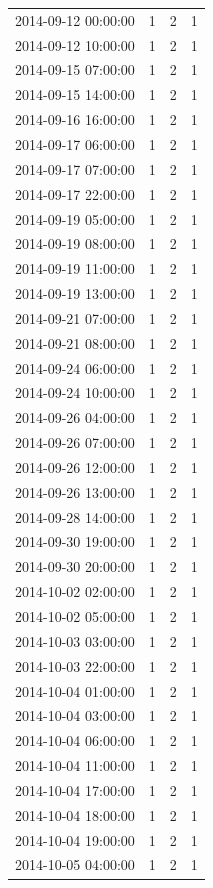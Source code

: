 \begin{tabular}{lrrr}
2014-09-12 00:00:00 & 1 & 2 & 1 \\
2014-09-12 10:00:00 & 1 & 2 & 1 \\
2014-09-15 07:00:00 & 1 & 2 & 1 \\
2014-09-15 14:00:00 & 1 & 2 & 1 \\
2014-09-16 16:00:00 & 1 & 2 & 1 \\
2014-09-17 06:00:00 & 1 & 2 & 1 \\
2014-09-17 07:00:00 & 1 & 2 & 1 \\
2014-09-17 22:00:00 & 1 & 2 & 1 \\
2014-09-19 05:00:00 & 1 & 2 & 1 \\
2014-09-19 08:00:00 & 1 & 2 & 1 \\
2014-09-19 11:00:00 & 1 & 2 & 1 \\
2014-09-19 13:00:00 & 1 & 2 & 1 \\
2014-09-21 07:00:00 & 1 & 2 & 1 \\
2014-09-21 08:00:00 & 1 & 2 & 1 \\
2014-09-24 06:00:00 & 1 & 2 & 1 \\
2014-09-24 10:00:00 & 1 & 2 & 1 \\
2014-09-26 04:00:00 & 1 & 2 & 1 \\
2014-09-26 07:00:00 & 1 & 2 & 1 \\
2014-09-26 12:00:00 & 1 & 2 & 1 \\
2014-09-26 13:00:00 & 1 & 2 & 1 \\
2014-09-28 14:00:00 & 1 & 2 & 1 \\
2014-09-30 19:00:00 & 1 & 2 & 1 \\
2014-09-30 20:00:00 & 1 & 2 & 1 \\
2014-10-02 02:00:00 & 1 & 2 & 1 \\
2014-10-02 05:00:00 & 1 & 2 & 1 \\
2014-10-03 03:00:00 & 1 & 2 & 1 \\
2014-10-03 22:00:00 & 1 & 2 & 1 \\
2014-10-04 01:00:00 & 1 & 2 & 1 \\
2014-10-04 03:00:00 & 1 & 2 & 1 \\
2014-10-04 06:00:00 & 1 & 2 & 1 \\
2014-10-04 11:00:00 & 1 & 2 & 1 \\
2014-10-04 17:00:00 & 1 & 2 & 1 \\
2014-10-04 18:00:00 & 1 & 2 & 1 \\
2014-10-04 19:00:00 & 1 & 2 & 1 \\
2014-10-05 04:00:00 & 1 & 2 & 1 \\

\end{tabular}
